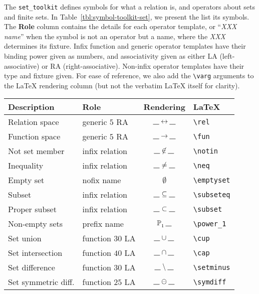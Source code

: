 \documentclass{article}
\begin{document}
The \texttt{set\_toolkit} defines symbols for what a relation is, and operators about sets and finite sets.
In Table~\ref{tbl:symbol-toolkit-set}, we present the list its symbols.
The \textbf{Role} column contains the details for each operator template, or ``\textit{XXX name}''
when the symbol is not an operator but a name, where the \textit{XXX} determines its fixture.
Infix function and generic operator templates have their binding power given as numbers, and
associativity given as either LA (left-associative) or RA (right-associative). Non-infix operator templates have
their type and fixture given. For ease of reference, we also add the \verb|\varg| arguments to the
\LaTeX{} rendering column (but not the verbatim \LaTeX{} itself for clarity).
%
\begin{table}[ht]
\centering
\begin{tabular}{|l|l|c|l|}
   \hline
   \textbf{Description} & \textbf{Role} & \textbf{Rendering} & \textbf{\LaTeX} \\
   \hline
   Relation space      & generic $5$ RA   & $\varg\rel\varg$      & \verb|\rel| \\
   \hline
   Function space      & generic $5$ RA   & $\varg\fun\varg$      & \verb|\fun| \\
   \hline
   Not set member      & infix relation   & $\varg\notin\varg$    & \verb|\notin| \\
   \hline
   Inequality          & infix relation   & $\varg\neq\varg$      & \verb|\neq| \\
   \hline
   Empty set           & nofix name       & $\emptyset$           & \verb|\emptyset| \\
   \hline
   Subset              & infix relation   & $\varg\subseteq\varg$ & \verb|\subseteq| \\
   \hline
   Proper subset       & infix relation   & $\varg\subset\varg$   & \verb|\subset| \\
   \hline
   Non-empty sets      & prefix name      & $\power_1\varg$       & \verb|\power_1| \\
   \hline
   Set union           & function $30$ LA & $\varg\cup\varg$      & \verb|\cup| \\
   \hline
   Set intersection    & function $40$ LA & $\varg\cap\varg$      & \verb|\cap| \\
   \hline
   Set difference      & function $30$ LA & $\varg\setminus\varg$ & \verb|\setminus| \\
   \hline
   Set symmetric diff. & function $25$ LA & $\varg\symdiff\varg$  & \verb|\symdiff| \\

\end{tabular}
\end{table}
\end{document}
